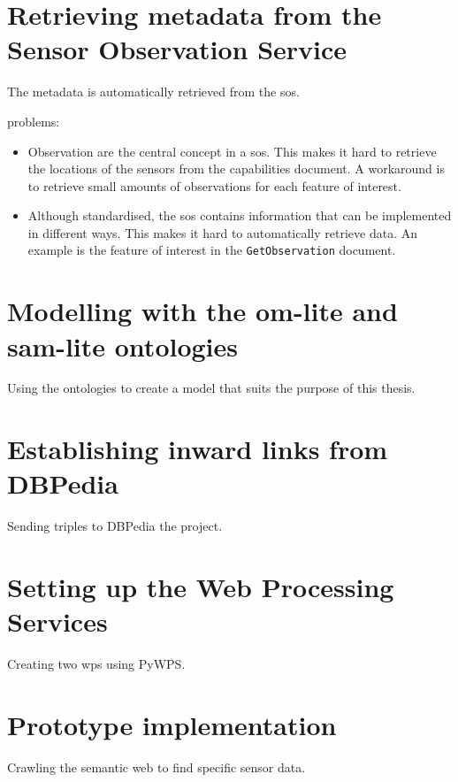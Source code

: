 

\section{Retrieving metadata from the Sensor Observation Service}
The metadata is automatically retrieved from the \ac{sos}.

problems: 
\begin{itemize}
	\item Observation are the central concept in a \ac{sos}. This makes it hard to retrieve the locations of the sensors from the capabilities document. A workaround is to retrieve small amounts of observations for each feature of interest.
	\item Although standardised, the \ac{sos} contains information that can be implemented in different ways. This makes it hard to automatically retrieve data. An example is the feature of interest in the \texttt{GetObservation} document. 
\end{itemize}

\section{Modelling with the om-lite and sam-lite ontologies}
Using the ontologies to create a model that suits the purpose of this thesis.

\section{Establishing inward links from DBPedia}
Sending triples to DBPedia the project.

\section{Setting up the Web Processing Services}
Creating two \ac{wps} using PyWPS.

\section{Prototype implementation}
Crawling the semantic web to find specific sensor data.